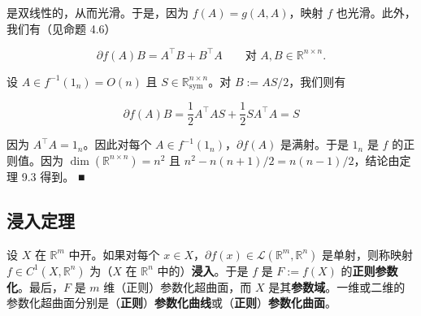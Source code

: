 \begin{example}
\begin{subitems}
是双线性的，从而光滑。于是，因为 $ f(A) = g(A, A) $，映射 $ f $ 也光滑。此外，我们有（见命题 4.6）

\[
\partial f(A)B = A^{\top}B + B^{\top}A \qquad \text{对 } A, B \in \mathbb{R}^{n \times n} .
\]
\item

设 $ A \in f^{-1}(1_{n}) = O(n) $ 且 $ S \in \mathbb{R}^{n \times n}_{\mathrm{sym}} $。对 $ B := AS/2 $，我们则有

\[
\partial f(A)B = \frac{1}{2}A^{\top}AS + \frac{1}{2}SA^{\top}A = S
\]

因为 $ A^{\top}A = 1_{n} $。因此对每个 $ A \in f^{-1}(1_{n}) $，$ \partial f(A) $ 是满射。于是 $ 1_{n} $ 是 $ f $ 的正则值。因为 $ \dim(\mathbb{R}^{n \times n}) = n^{2} $ 且 $ n^{2} - n(n + 1)/2 = n(n - 1)/2 $，结论由定理 9.3 得到。 \nobreak\hspace{0.35em}■

\end{subitems}

\end{example}

\subsection*{浸入定理}

设 $ X $ 在 $ \mathbb{R}^{m} $ 中开。如果对每个 $ x \in X $，$ \partial f(x) \in \mathcal{L}(\mathbb{R}^{m}, \mathbb{R}^{n}) $ 是单射，则称映射 $ f \in C^{1}(X, \mathbb{R}^{n}) $ 为（$ X $ 在 $ \mathbb{R}^{n} $ 中的）\textbf{浸入}。于是 $ f $ 是 $ F := f(X) $ 的\textbf{正则参数化}。最后，$ F $ 是 $ m $ 维（正则）参数化超曲面，而 $ X $ 是其\textbf{参数域}。一维或二维的参数化超曲面分别是（\textbf{正则}）\textbf{参数化曲线}或（\textbf{正则}）\textbf{参数化曲面}。

